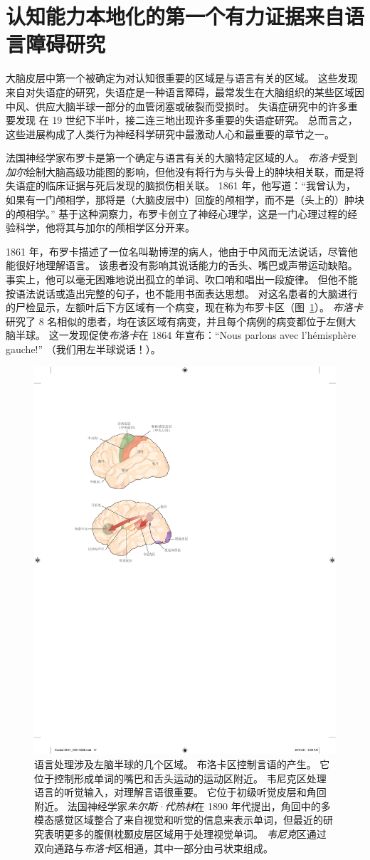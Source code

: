 \section{认知能力本地化的第一个有力证据来自语言障碍研究}

大脑皮层中第一个被确定为对认知很重要的区域是与语言有关的区域。
这些发现来自对失语症的研究，失语症是一种语言障碍，最常发生在大脑组织的某些区域因中风、供应大脑半球一部分的血管闭塞或破裂而受损时。
失语症研究中的许多重要发现
在 19 世纪下半叶，接二连三地出现许多重要的失语症研究。
总而言之，这些进展构成了人类行为神经科学研究中最激动人心和最重要的章节之一。


法国神经学家布罗卡是第一个确定与语言有关的大脑特定区域的人。
\textit{布洛卡}受到\textit{加尔}绘制大脑高级功能图的影响，但他没有将行为与头骨上的肿块相关联，而是将失语症的临床证据与死后发现的脑损伤相关联。
1861 年，他写道：“我曾认为，如果有一门颅相学，那将是（大脑皮层中）回旋的颅相学，而不是（头上的）肿块的颅相学。” 
基于这种洞察力，布罗卡创立了神经心理学，这是一门心理过程的经验科学，他将其与加尔的颅相学区分开来。


1861 年，布罗卡描述了一位名叫勒博涅的病人，他由于中风而无法说话，尽管他能很好地理解语言。
该患者没有影响其说话能力的舌头、嘴巴或声带运动缺陷。
事实上，他可以毫无困难地说出孤立的单词、吹口哨和唱出一段旋律。
但他不能按语法说话或造出完整的句子，也不能用书面表达思想。
对这名患者的大脑进行的尸检显示，左额叶后下方区域有一个病变，现在称为布罗卡区（图~\ref{fig:1_6}）。
\textit{布洛卡}研究了 8 名相似的患者，均在该区域有病变，并且每个病例的病变都位于左侧大脑半球。
这一发现促使\textit{布洛卡}在 1864 年宣布：“Nous parlons avec l’hémisphère gauche!” （我们用左半球说话！）。


\begin{figure}[htbp]
	\centering
	\includegraphics[width=0.55\linewidth]{chap01/fig_1_6}
	\caption{语言处理涉及左脑半球的几个区域。
		布洛卡区控制言语的产生。
		它位于控制形成单词的嘴巴和舌头运动的运动区附近。
		韦尼克区处理语言的听觉输入，对理解言语很重要。
		它位于初级听觉皮层和角回附近。
		法国神经学家\textit{朱尔斯·代热林}在 1890 年代提出，角回中的多模态感觉区域整合了来自视觉和听觉的信息来表示单词，但最近的研究表明更多的腹侧枕颞皮层区域用于处理视觉单词。
		\textit{韦尼克}区通过双向通路与\textit{布洛卡}区相通，其中一部分由弓状束组成\cite{geschwind1979specializations}。}
	\label{fig:1_6}
\end{figure}


